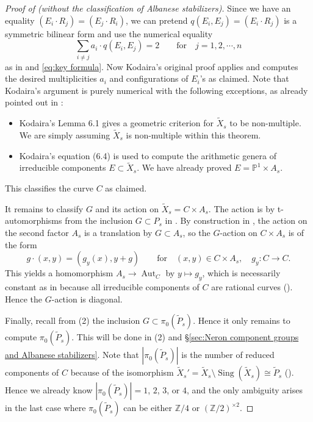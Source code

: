 \documentclass[reqno, letterpaper]{amsart}
\numberwithin{equation}{subsection}
\let\to\longrightarrow
\let\mapsto\longmapsto
\newcommand{\PP}{\mathbb{P}}
\newcommand{\ZZ}{\mathbb{Z}}
\DeclareMathOperator{\Aut}{Aut}
\DeclareMathOperator{\Sing}{Sing}
\begin{document}
\begin{proof}[Proof of  (without the classification of Albanese stabilizers)]
			Since we have an equality $(E_i \cdot R_j) = (E_j \cdot R_i)$, we can pretend $q(E_i, E_j) = (E_i \cdot R_j)$ is a symmetric bilinear form and use the numerical equality
			\[ \sum_{i \neq j} a_i \cdot q(E_i, E_j) = 2 \qquad\mbox{for}\quad j = 1, 2, \cdots, n \]
			as in  and \eqref{eq:key formula}. Now Kodaira's original proof \cite[Theorem~6.2, (6.5)]{kod63} applies and computes the desired multiplicities $a_i$ and configurations of $E_i$'s as claimed. Note that Kodaira's argument is purely numerical with the following exceptions, as already pointed out in \cite[p.~1003]{hwang-ogu09}:
			\begin{itemize}
				\item Kodaira's Lemma 6.1 gives a geometric criterion for $\tilde X_s$ to be non-multiple. We are simply assuming $\tilde X_s$ is non-multiple within this theorem.
				\item Kodaira's equation (6.4) is used to compute the arithmetic genera of irreducible components $E \subset \tilde X_s$. We have already proved $E = \PP^1 \times A_s$.
			\end{itemize}
			This classifies the curve $C$ as claimed.
			
			\medskip
			
			It remains to classify $G$ and its action on $\tilde X_s = C \times A_s$. The action is by t-automorphisms from the inclusion $G \subset P_s$ in . By construction in , the action on the second factor $A_s$ is a translation by $G \subset A_s$, so the $G$-action on $C \times A_s$ is of the form
			\[ g \cdot (x,y) = (g_y(x), y + g) \qquad\mbox{for}\quad (x,y) \in C \times A_s, \quad g_y : C \to C .\]
			This yields a homomorphism $A_s \to \Aut_C$ by $y \mapsto g_y$, which is necessarily constant as in  because all irreducible components of $C$ are rational curves (). Hence the $G$-action is diagonal.
			
			Finally, recall from (2) the inclusion $G \subset \pi_0(\tilde P_s)$. Hence it only remains to compute $\pi_0(\tilde P_s)$. This will be done in (2) and \S \ref{sec:Neron component groups and Albanese stabilizers}. Note that $|\pi_0(\tilde P_s)|$ is the number of reduced components of $C$ because of the isomorphism $\tilde X_s' = \tilde X_s \setminus \Sing(\tilde X_s) \cong \tilde P_s$ (). Hence we already know $|\pi_0(\tilde P_s)| = 1$, $2$, $3$, or $4$, and the only ambiguity arises in the last case where $\pi_0(\tilde P_s)$ can be either $\ZZ/4$ or $(\ZZ/2)^{\times 2}$.
		\end{proof}
		
\end{document}
